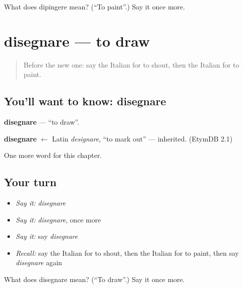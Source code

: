 \begin{tcolorbox}[breakable,colback=teal!4,colframe=teal!35!black,title={Before you move on}]
What does dipingere mean? (\textquotedblleft{}To paint\textquotedblright{}.) Say it once more.
\end{tcolorbox}
\section[disegnare]{disegnare — to draw}

\label{lesson:IT-C141-disegnare}



\begin{quote}
Before the new one: say the Italian for to shout, then the Italian for to paint.
\end{quote}

\subsection*{You'll want to know: disegnare}
\textbf{disegnare} — \textquotedblleft{}to draw\textquotedblright{}.

\begin{cousinweb}
\textbf{disegnare} $\leftarrow$ Latin \emph{designare}, \textquotedblleft{}to mark out\textquotedblright{} — inherited. (EtymDB 2.1)
\end{cousinweb}

\begin{grammarlens}[title={What you've built}]
One more word for this chapter.
\end{grammarlens}

\subsection*{Your turn}
\begin{itemize}
\raggedright
  \item \emph{Say it:} \emph{disegnare}
  \item \emph{Say it:} \emph{disegnare}, once more
  \item \emph{Say it:} say \emph{disegnare}
  \item \emph{Recall:} say the Italian for to shout, then the Italian for to paint, then say \emph{disegnare} again
\end{itemize}

\begin{tcolorbox}[breakable,colback=teal!4,colframe=teal!35!black,title={Before you move on}]
What does disegnare mean? (\textquotedblleft{}To draw\textquotedblright{}.) Say it once more.
\end{tcolorbox}
